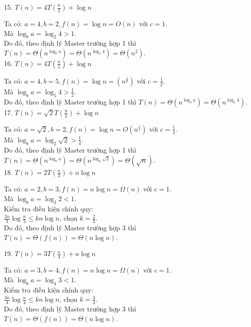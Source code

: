\documentclass[12pt, a4paper, fleqn]{article}
\begin{document}
		15. $\displaystyle
		T(n) = 4T\left( \frac{n}{2} \right) + \log n$
		
		Ta có: $a = 4, b = 2, f(n) = \log n = O (n)$ với $c = 1$.\\
		Mà $\log_{b} a = \log_{2} 4 > 1$.\\
		Do đó, theo định lý Master trường hợp 1 thì $T(n) = \Theta \left( n^{\log_{b} a} \right) = \Theta (n^{\log_{2} 4}) = \Theta (n^2)$.
		\\
		
		16. $\displaystyle
		T(n) = 4T\left( \frac{n}{5} \right) + \log n$
		
		Ta có: $a = 4, b = 5, f(n) = \log n = \left( n^{\frac{1}{2}} \right)$ với $\displaystyle
		c = \frac{1}{2}$.\\
		Mà $\displaystyle
		\log_{b} a = \log_{5} 4 > \frac{1}{2}$.\\
		Do đó, theo định lý Master trường hợp 1 thì $T(n) = \Theta \left( n^{\log_{b} a} \right) = \Theta (n^{\log_{5} 4})$.
		\\
		
		17. $\displaystyle
		T(n) = \sqrt{2} T\left( \frac{n}{2} \right) + \log n$
		
		Ta có: $\displaystyle
		a = \sqrt{2}, b = 2, f(n) = \log n = O \left( n^\frac{1}{4} \right)$ với $\displaystyle
		c = \frac{1}{4}$.\\
		Mà $\displaystyle
		\log_{b} a = \log_{2} \sqrt{2} > \frac{1}{4}$.\\
		Do đó, theo định lý Master trường hợp 1 thì $T(n) = \Theta \left( n^{\log_{b} a} \right) = \Theta (n^{\log_{2} \sqrt{2}}) = \Theta (\sqrt{n})$.
		\\
		
		18. $\displaystyle
		T(n) = 2T\left( \frac{n}{3} \right) + n \log n$
		
		Ta có: $a = 2, b = 3, f(n) = n \log n = \Omega (n)$ với $c = 1$.\\
		Mà $\log_{b} a = \log_{3} 2 < 1$.\\
		Kiểm tra điều kiện chính quy:\\
		$\displaystyle
		\frac{2n}{3} \log \frac{n}{3} \leq kn \log n$, chọn $\displaystyle
		k = \frac{2}{3}$.\\
		Do đó, theo định lý Master trường hợp 3 thì $T(n) = \Theta (f(n)) = \Theta (n \log n)$.
		\clearpage
		
		19. $\displaystyle
		T(n) = 3T\left( \frac{n}{4} \right) + n \log n$
		
		Ta có: $a = 3, b = 4, f(n) = n \log n = \Omega (n)$ với $c = 1$.\\
		Mà $\log_{b} a = \log_{4} 3 < 1$.\\
		Kiểm tra điều kiện chính quy:\\
		$\displaystyle
		\frac{3n}{4} \log \frac{n}{4} \leq kn \log n$, chọn $\displaystyle
		k = \frac{3}{4}$.\\
		Do đó, theo định lý Master trường hợp 3 thì $T(n) = \Theta (f(n)) = \Theta (n \log n)$.
		\\
	
\end{document}
